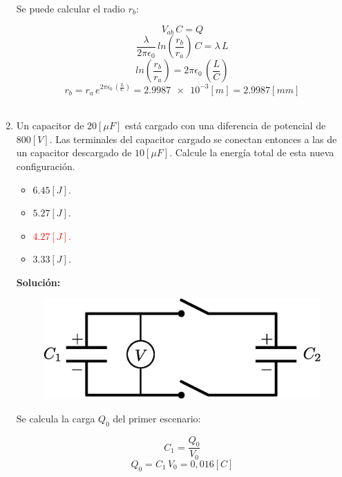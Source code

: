 \documentclass[letter,11pt]{article}
\begin{document}
\begin{enumerate}
Se puede calcular el radio $r_b$:

\begin{equation*}
    V_{ab}\,C = Q
\end{equation*}
\begin{equation*}
    \frac{\lambda}{2\pi\epsilon_0}\,ln\left(\frac{r_b}{r_a}\right)\,C = \lambda\,L
\end{equation*}
\begin{equation*}
    ln\left(\frac{r_b}{r_a}\right) = 2\pi\epsilon_0\,\left(\frac{L}{C}\right)
\end{equation*}
\begin{equation*}
    r_b = r_a\,e^{2\pi\epsilon_0\,\left(\frac{L}{C}\right)} = \num{2.9987e-3} [m] = 2.9987 [mm]
\end{equation*}
\\

\item Un capacitor de $20 [\mu F]$ está cargado con una diferencia de potencial
de $800 [V]$. Las terminales del capacitor cargado se conectan entonces a las de
un capacitor descargado de $10 [\mu F]$. Calcule la energía total de esta nueva
configuración.

\begin{itemize}
    \item $6.45 [J]$.
    \item $5.27 [J]$.
    \item \textcolor{red}{$4.27 [J]$.}
    \item $3.33 [J]$.
\end{itemize}

\textbf{Solución:}

\begin{figure}[!h]
\centering
\includegraphics[scale=0.38]{resources/a10.eps}
\end{figure}

Se calcula la carga $Q_0$ del primer escenario:

\begin{equation*}
    C_1 = \frac{Q_0}{V_0}
\end{equation*}
\begin{equation*}
    Q_0 = C_1\,V_0 = 0,016 [C]
\end{equation*}


\end{enumerate}
\end{document}
